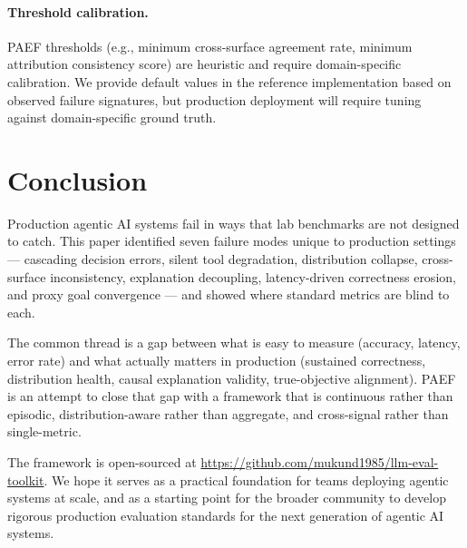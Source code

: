 \documentclass{article}
\begin{document}
\paragraph{Threshold calibration.}
PAEF thresholds (e.g., minimum cross-surface agreement rate, minimum
attribution consistency score) are heuristic and require domain-specific
calibration.  We provide default values in the reference implementation based
on observed failure signatures, but production deployment will require tuning
against domain-specific ground truth.

\section{Conclusion}
\label{sec:conclusion}

Production agentic AI systems fail in ways that lab benchmarks are not designed
to catch.  This paper identified seven failure modes unique to production
settings --- cascading decision errors, silent tool degradation, distribution
collapse, cross-surface inconsistency, explanation decoupling, latency-driven
correctness erosion, and proxy goal convergence --- and showed where standard
metrics are blind to each.

The common thread is a gap between what is easy to measure (accuracy, latency,
error rate) and what actually matters in production (sustained correctness,
distribution health, causal explanation validity, true-objective alignment).
PAEF is an attempt to close that gap with a framework that is continuous rather
than episodic, distribution-aware rather than aggregate, and cross-signal rather
than single-metric.

The framework is open-sourced at
\url{https://github.com/mukund1985/llm-eval-toolkit}.  We hope it serves as
a practical foundation for teams deploying agentic systems at scale, and as a
starting point for the broader community to develop rigorous production
evaluation standards for the next generation of agentic AI systems.




\end{document}
